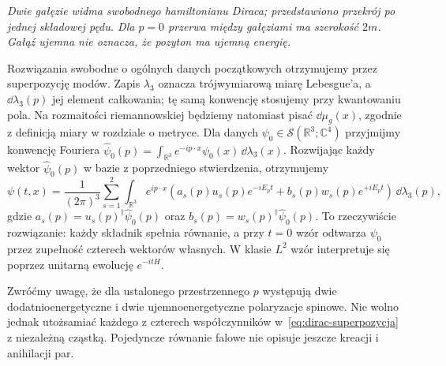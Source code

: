 \begin{center}

{\small\itshape Dwie gałęzie widma swobodnego hamiltonianu
Diraca; przedstawiono przekrój po jednej składowej pędu.
Dla $p=0$ przerwa między gałęziami ma szerokość $2m$.
Gałąź ujemna nie oznacza, że pozyton ma ujemną energię.}
\end{center}

Rozwiązania swobodne o ogólnych danych początkowych
otrzymujemy przez superpozycję modów.
Zapis $\lambda_3$ oznacza trójwymiarową miarę
Lebesgue'a, a $\dd\lambda_3(p)$ jej element
całkowania; tę samą konwencję stosujemy przy
kwantowaniu pola. Na rozmaitości riemannowskiej
będziemy natomiast pisać $\dd\mu_g(x)$,
zgodnie z definicją miary w rozdziale o metryce. Dla danych
$\psi_0\in\mathcal S(\mathbb R^3;\mathbb C^4)$
przyjmijmy konwencję Fouriera
$\widehat\psi_0(p)=\int_{\mathbb R^3}
 e^{-ip\cdot x}\psi_0(x)\,\dd\lambda_3(x)$.
Rozwijając każdy wektor $\widehat\psi_0(p)$
w bazie z poprzedniego stwierdzenia, otrzymujemy
\begin{equation}\label{eq:dirac-superpozycja}
 \psi(t,x)=\frac1{(2\pi)^3}\sum_{s=1}^2\int_{\mathbb R^3}
 e^{ip\cdot x}
 \left(a_s(p)u_s(p)e^{-iE_pt}
       +b_s(p)w_s(p)e^{+iE_pt}\right)\,\dd\lambda_3(p),
\end{equation}
gdzie $a_s(p)=u_s(p)^\dagger\widehat\psi_0(p)$
oraz $b_s(p)=w_s(p)^\dagger\widehat\psi_0(p)$.
To rzeczywiście rozwiązanie: każdy składnik spełnia
równanie, a przy $t=0$ wzór odtwarza $\psi_0$
przez zupełność czterech wektorów własnych.
W klasie $L^2$ wzór interpretuje się poprzez
unitarną ewolucję $e^{-itH}$.

Zwróćmy uwagę, że dla ustalonego przestrzennego $p$
występują dwie dodatnioenergetyczne i dwie
ujemnoenergetyczne polaryzacje spinowe.
Nie wolno jednak utożsamiać każdego z czterech
współczynników w~\eqref{eq:dirac-superpozycja}
z niezależną cząstką. Pojedyncze równanie
falowe nie opisuje jeszcze kreacji i anihilacji par.

